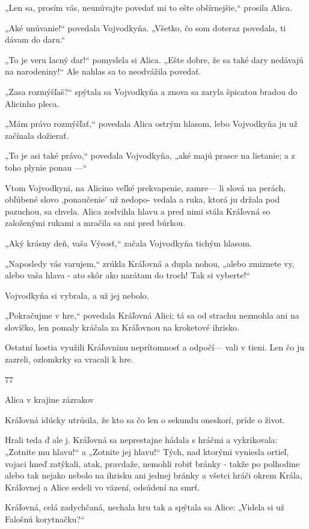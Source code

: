 \documentclass[12pt]{article}
\begin{document}
\begin{Parallel}[p]{}{}
{{„Len sa, prosím vás, neunúvajte povedať mi to ešte
obšírnejšie,“ prosila Alica.

„Aké unúvanie!“ povedala Vojvodkyňa. „Všetko, čo
som doteraz povedala, ti dávam do daru.“

„To je veru lacný dar!“ pomyslela si Alica. „Ešte dobre,
že sa také dary nedávajú na narodeniny!“ Ale nahlas sa to
neodvážila povedať.

„Zasa rozmýšľaš?“ spýtala sa Vojvodkyňa a znova sa
zaryla špicatou bradou do Alicinho pleca.

„Mám právo rozmýšľať,“ povedala Alica ostrým hlasom,
lebo Vojvodkyňa ju už začínala dožierať.

„To je asi také právo,“ povedala Vojvodkyňa, „aké majú
prasce na lietanie; a z toho plynie ponau —“

Vtom Vojvodkyni, na Alicino veľké prekvapenie, zamre—
li slová na perách, obľúbené slovo ,ponaučenie' už nedopo-
vedala a ruka, ktorá ju držala pod pazuchou, sa chvela. Alica
zodvihla hlavu a pred nimi stála Kráľovná so založenými
rukami a mračila sa ani pred búrkou.

„Aký krásny deň, vaša Výsosť,“ začala Vojvodkyňa
tichým hlasom.

„Naposledy vás varujem,“ zrúkla Kráľovná a dupla
nohou, „alebo zmiznete vy, alebo vaša hlava - ato skôr ako
narátam do troch! Tak si vyberte!“

Vojvodkyňa si vybrala, a už jej nebolo.

„Pokračujme v hre,“ povedala Kráľovná Alici; tá sa od
strachu nezmohla ani na slovíčko, len pomaly kráčala za
Kráľovnou na kroketové ihrisko.

Ostatní hostia využili Kráľovninu neprítomnosť a odpočí—
vali v tieni. Len čo ju zazreli, ozlomkrky sa vracali k hre.

77

Alica v krajine zázrakov

Kráľovná idúcky utrúsila, že kto sa čo len o sekundu
oneskorí, príde o život.

Hrali teda ď ale j. Kráľovná sa neprestajne hádala s hráčmi
a vykrikovala: „Zotnite mu hlavu!“ a „Zotnite jej hlavu!“
Tých, nad ktorými vyniesla ortieľ, vojaci hneď zatýkali,
atak, pravdaže, nemohli robiť bránky - takže po polhodine
alebo tak nejako nebolo na ihrisku ani jednej bránky a všetci
hráči okrem Krála, Kráľovnej a Alice sedeli vo väzení,
odsúdení na smrť.

Kráľovná, celá zadychčaná, nechala hru tak a spýtala sa
Alice: „Videla si už Falošnú korytnačku?“

}}
\end{Parallel}
\end{document}
